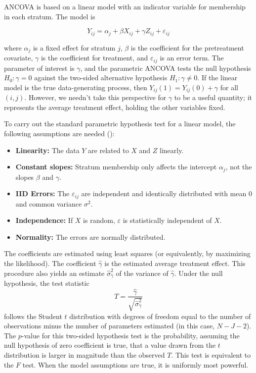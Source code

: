 \documentclass[12pt]{article}
\begin{document}
ANCOVA is based on a linear model with an indicator variable for membership in each stratum.
The model is

\begin{equation}\label{eqn:ancova}
Y_{ij} = \alpha_j + \beta X_{ij} + \gamma Z_{ij} + \varepsilon_{ij}
\end{equation}

\noindent where $\alpha_j$ is a fixed effect for stratum $j$, $\beta$ is the coefficient for the pretreatment covariate,
$\gamma$ is the coefficient for treatment,
and $\varepsilon_{ij}$ is an error term.
The parameter of interest is $\gamma$, and the parametric ANCOVA tests the null hypothesis $H_0: \gamma = 0$ against
the two-sided alternative hypothesis $H_1: \gamma \neq 0$.
If the linear model is the true data-generating process, then $Y_{ij}(1) = Y_{ij}(0) + \gamma$ for all $(i, j)$.
However, we needn't take this perspective for $\gamma$ to be a useful quantity; it represents the average treatment effect, holding the other variables fixed.



To carry out the standard parametric hypothesis test for a linear model, the following assumptions are needed (\cite{freedman_statistical_2005}):
\begin{itemize}
\item \textbf{Linearity:} The data $Y$ are related to $X$ and $Z$ linearly.
\item \textbf{Constant slopes:} Stratum membership only affects the intercept $\alpha_j$, not the slopes $\beta$ and $\gamma$.
\item \textbf{IID Errors:} The $\varepsilon_{ij}$ are independent and identically distributed with mean $0$ and common variance $\sigma^2$.
\item \textbf{Independence:} If $X$ is random, $\varepsilon$ is statistically independent of $X$.
\item \textbf{Normality:} The errors are normally distributed.
\end{itemize}

The coefficients are estimated using least squares (or equivalently, by maximizing the likelihood).
The coefficient $\hat{\gamma}$ is the estimated average treatment effect. 
This procedure also yields an estimate $\hat{\sigma}_{\hat{\gamma}}^2$ of the variance of $\hat{\gamma}$.
Under the null hypothesis, the test statistic 
$$ T = \frac{\hat{\gamma}}{\sqrt{ \hat{\sigma}_{\hat{\gamma}}^2}}$$
follows the Student $t$ distribution with degrees of freedom equal to the number of observations minus the number of parameters estimated (in this case, $N - J - 2$).
The $p$-value for this two-sided hypothesis test is the probability, assuming the null hypothesis of zero coefficient is true, that a value drawn from the $t$ distribution is larger in magnitude than the observed $T$.
This test is equivalent to the $F$ test.
When the model assumptions are true, it is uniformly most powerful.
\end{document}
